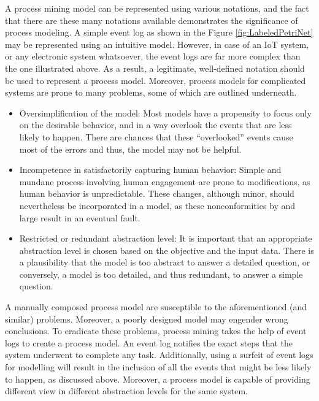 A process mining model can be represented using various notations, and the fact that there are these many notations available demonstrates the significance of process modeling. A simple event log as shown in the Figure \ref{fig:LabeledPetriNet} may be represented using an intuitive model. However, in case of an IoT system, or any electronic system whatsoever, the event logs are far more complex than the one illustrated above. As a result, a legitimate, well-defined notation should be used to represent a process model. Moreover, process models for complicated systems are prone to many problems, some of which are outlined underneath.

\begin{itemize}
	\item Oversimplification of the model: Most models have a propensity to focus only on the desirable behavior, and in a way overlook the events that are less likely to happen. There are chances that these “overlooked” events cause most of the errors and thus, the model may not be helpful.
	\item Incompetence in satisfactorily capturing human behavior: Simple and mundane process involving human engagement are prone to modifications, as human behavior is unpredictable. These changes, although minor, should nevertheless be incorporated in a model, as these nonconformities by and large result in an eventual fault.
	\item Restricted or redundant abstraction level: It is important that an appropriate abstraction level is chosen based on the objective and the input data. There is a plausibility that the model is too abstract to answer a detailed question, or conversely, a model is too detailed, and thus redundant, to answer a simple question.
\end{itemize}

A manually composed process model are susceptible to the aforementioned (and similar) problems. Moreover, a poorly designed model may engender wrong conclusions. To eradicate these problems, process mining takes the help of event logs to create a process model. An event log notifies the exact steps that the system underwent to complete any task. Additionally, using a surfeit of event logs for modelling will result in the inclusion of all the events that might be less likely to happen, as discussed above. Moreover, a process model is capable of providing different view in different abstraction levels for the same system.


